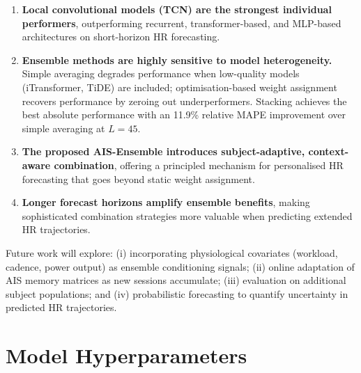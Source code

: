 \documentclass[11pt,a4paper]{article}
\begin{document}
\begin{enumerate}
  \item \textbf{Local convolutional models (TCN) are the strongest individual
        performers}, outperforming recurrent, transformer-based, and MLP-based
        architectures on short-horizon HR forecasting.

  \item \textbf{Ensemble methods are highly sensitive to model heterogeneity.}
        Simple averaging degrades performance when low-quality models
        (iTransformer, TiDE) are included; optimisation-based weight assignment
        recovers performance by zeroing out underperformers.  Stacking achieves
        the best absolute performance with an 11.9\% relative MAPE improvement
        over simple averaging at $L=45$.

  \item \textbf{The proposed AIS-Ensemble introduces subject-adaptive,
        context-aware combination}, offering a principled mechanism for
        personalised HR forecasting that goes beyond static weight assignment.

  \item \textbf{Longer forecast horizons amplify ensemble benefits}, making
        sophisticated combination strategies more valuable when predicting
        extended HR trajectories.
\end{enumerate}

Future work will explore: (i) incorporating physiological covariates (workload,
cadence, power output) as ensemble conditioning signals; (ii) online adaptation
of AIS memory matrices as new sessions accumulate; (iii) evaluation on
additional subject populations; and (iv) probabilistic forecasting to quantify
uncertainty in predicted HR trajectories.

\appendix

\section{Model Hyperparameters}
\end{document}
